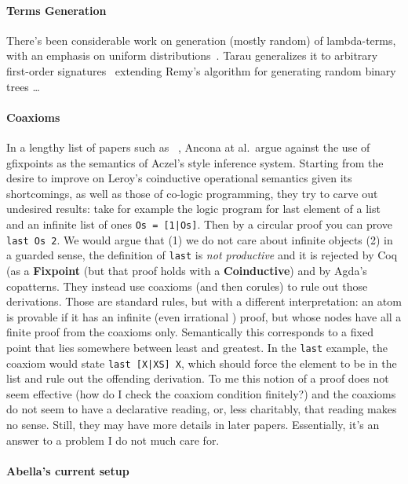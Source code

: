 \paragraph{Terms Generation}

There's been considerable work on generation (mostly random) of
lambda-terms, with an emphasis on uniform
distributions~\cite{BendkowskiGT17}. Tarau generalizes it to arbitrary
first-order signatures~\cite{Tarau18} extending Remy's algorithm for
generating random binary trees \dots

\paragraph{Coaxioms}

In a lengthy list of papers such as ~\cite{AnconaDZ17, Dagnino19},
Ancona at al.\ argue against the use of gfixpoints as the semantics of
Aczel's style inference system. Starting from the desire to improve on
Leroy's coinductive operational semantics given its shortcomings, as
well as those of co-logic programming, they try to carve out undesired
results: take for example the logic program for last element of a list
and an infinite list of ones \texttt{Os = [1|Os]}. Then by a circular
proof you can prove \texttt{last Os 2}. We would argue that (1) we do
not care about infinite objects (2) in a guarded sense, the definition
of \texttt{last} is \emph{not productive} and it is rejected by Coq
(as a \textbf{Fixpoint} (but that proof holds with a
\textbf{Coinductive}) and by Agda's copatterns. They instead use
coaxioms (and then corules) to rule out those derivations. Those are
standard rules, but with a different interpretation: an atom is
provable if it has an infinite (even irrational ) proof, but whose
nodes have all a finite proof from the coaxioms only. Semantically
this corresponds to a fixed point that lies somewhere between least
and greatest. In the \texttt{last} example, the coaxiom would state
\texttt{last [X|XS] X}, which should force the element to be in the
list and rule out the offending derivation.  To me this notion of a
proof does not seem effective (how do I check the coaxiom condition
finitely?) and the coaxioms do not seem to have a declarative reading,
or, less charitably, that reading makes no sense. Still, they may have
more details in later papers. Essentially, it's an answer to a problem
I do not much care for.

\paragraph{Abella's current setup}

